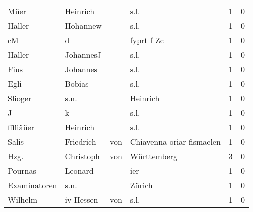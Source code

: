\documentclass[10pt,a4paper,landscape]{article}
\begin{document}
\begin{longtable}{llllrr}
                     Müer &                           Heinrich &             &                                        s.l. &          1 &         0 \\
                   Haller &                           Hohannew &             &                                        s.l. &          1 &         0 \\
                       cM &                                  d &             &                                  fyprt f Zc &          1 &         0 \\
                   Haller &                          JohannesJ &             &                                        s.l. &          1 &         0 \\
                     Fius &                           Johannes &             &                                        s.l. &          1 &         0 \\
                     Egli &                             Bobias &             &                                        s.l. &          1 &         0 \\
                  Slioger &                               s.n. &             &                                    Heinrich &          1 &         0 \\
                        J &                                  k &             &                                        s.l. &          1 &         0 \\
                ffffiäüer &                           Heinrich &             &                                        s.l. &          1 &         0 \\
                    Salis &                          Friedrich &         von &                   Chiavenna oriar fismaclen &          1 &         0 \\
                     Hzg. &                          Christoph &         von &                                 Württemberg &          3 &         0 \\
                  Pournas &                            Leonard &             &                                         ier &          1 &         0 \\
             Examinatoren &                               s.n. &             &                                      Zürich &          1 &         0 \\
                  Wilhelm &                         iv  Hessen &         von &                                        s.l. &          1 &         0 \\

\end{longtable}
\end{document}

